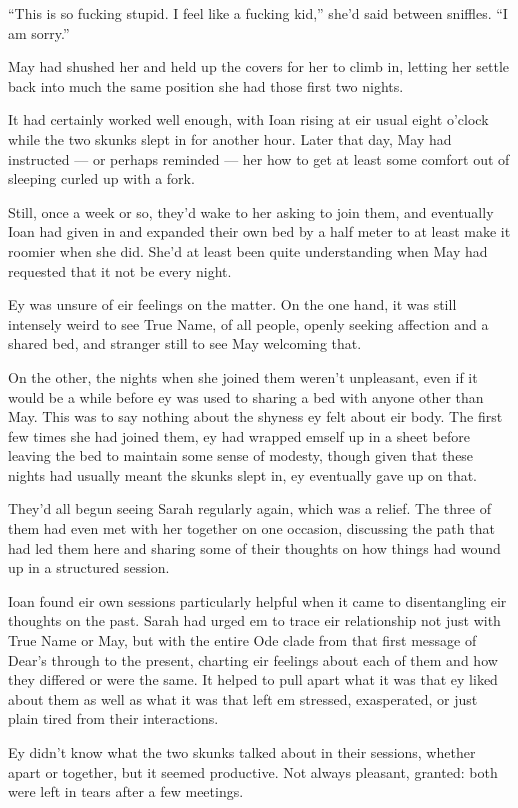 ``This is so fucking stupid. I feel like a fucking kid,'' she'd said between sniffles. ``I am sorry.''

May had shushed her and held up the covers for her to climb in, letting her settle back into much the same position she had those first two nights.

It had certainly worked well enough, with Ioan rising at eir usual eight o'clock while the two skunks slept in for another hour. Later that day, May had instructed — or perhaps reminded — her how to get at least some comfort out of sleeping curled up with a fork.

Still, once a week or so, they'd wake to her asking to join them, and eventually Ioan had given in and expanded their own bed by a half meter to at least make it roomier when she did. She'd at least been quite understanding when May had requested that it not be every night.

Ey was unsure of eir feelings on the matter. On the one hand, it was still intensely weird to see True Name, of all people, openly seeking affection and a shared bed, and stranger still to see May welcoming that.

On the other, the nights when she joined them weren't unpleasant, even if it would be a while before ey was used to sharing a bed with anyone other than May. This was to say nothing about the shyness ey felt about eir body. The first few times she had joined them, ey had wrapped emself up in a sheet before leaving the bed to maintain some sense of modesty, though given that these nights had usually meant the skunks slept in, ey eventually gave up on that.

They'd all begun seeing Sarah regularly again, which was a relief. The three of them had even met with her together on one occasion, discussing the path that had led them here and sharing some of their thoughts on how things had wound up in a structured session.

Ioan found eir own sessions particularly helpful when it came to disentangling eir thoughts on the past. Sarah had urged em to trace eir relationship not just with True Name or May, but with the entire Ode clade from that first message of Dear's through to the present, charting eir feelings about each of them and how they differed or were the same. It helped to pull apart what it was that ey liked about them as well as what it was that left em stressed, exasperated, or just plain tired from their interactions.

Ey didn't know what the two skunks talked about in their sessions, whether apart or together, but it seemed productive. Not always pleasant, granted: both were left in tears after a few meetings.


